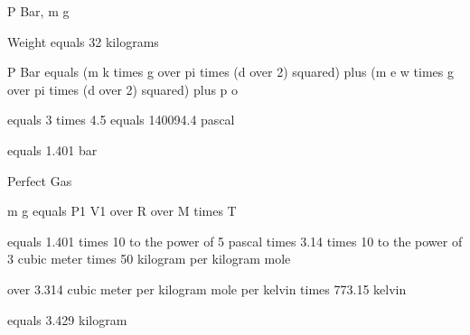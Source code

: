 P Bar, m g

Weight equals 32 kilograms

P Bar equals (m k times g over pi times (d over 2) squared) plus (m e w times g over pi times (d over 2) squared) plus p o

equals 3 times 4.5 equals 140094.4 pascal

equals 1.401 bar

Perfect Gas

m g equals P1 V1 over R over M times T

equals 1.401 times 10 to the power of 5 pascal times 3.14 times 10 to the power of 3 cubic meter times 50 kilogram per kilogram mole

over 3.314 cubic meter per kilogram mole per kelvin times 773.15 kelvin

equals 3.429 kilogram